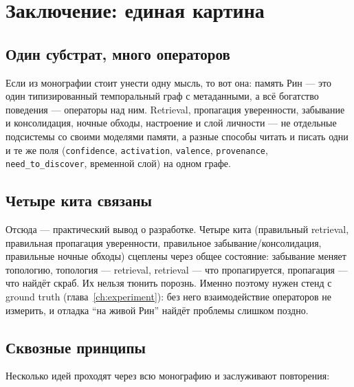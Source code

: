 \chapter{Заключение: единая картина}
\label{ch:conclusion}

\section{Один субстрат, много операторов}

Если из монографии стоит унести одну мысль, то вот она: память Рин --- это
один типизированный темпоральный граф с метаданными, а всё богатство
поведения --- операторы над ним. Retrieval, пропагация уверенности,
забывание и консолидация, ночные обходы, настроение и слой личности --- не
отдельные подсистемы со своими моделями памяти, а разные способы читать и
писать одни и те же поля (\texttt{confidence}, \texttt{activation},
\texttt{valence}, \texttt{provenance}, \texttt{need\_to\_discover},
временной слой) на одном графе.

\section{Четыре кита связаны}

Отсюда --- практический вывод о разработке. Четыре кита (правильный
retrieval, правильная пропагация уверенности, правильное
забывание/консолидация, правильные ночные обходы) сцеплены через общее
состояние: забывание меняет топологию, топология --- retrieval, retrieval ---
что пропагируется, пропагация --- что найдёт скраб. Их нельзя тюнить
порознь. Именно поэтому нужен стенд с ground truth (глава~\ref{ch:experiment}):
без него взаимодействие операторов не измерить, и отладка ``на живой Рин''
найдёт проблемы слишком поздно.

\section{Сквозные принципы}

Несколько идей проходят через всю монографию и заслуживают повторения:

